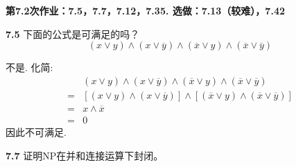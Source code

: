 \documentclass[UTF8]{report}
\newcommand{\problem}[1]{{\setlength{\parskip}{10pt}\noindent \bf{#1}}}
\newenvironment{solution}{{\noindent\hskip 2em \bf 解 \quad}}{}
\newcommand{\lno}[1]{\overline{#1}}
\newcommand{\NP}{\mathrm{NP}}
\begin{document}
\newpage

\textbf{第7.2次作业：7.5，7.7，7.12，7.35. 选做：7.13（较难），7.42}

\problem{7.5} 下面的公式是可满足的吗？
\[
    (x \lor y) \land (x \lor \lno y) \land (\lno x \lor y) \land (\lno x \lor \lno y)
\]

\begin{solution}
    不是. 化简:
    \begin{align*}
         {}& (x \lor y) \land (x \lor \lno y) \land (\lno x \lor y) \land (\lno x \lor \lno y) \\
        ={}& [(x \lor y) \land (x \lor \lno y)] \land [(\lno x \lor y) \land (\lno x \lor \lno y)] \\
        ={}& x \land \lno x \\
        ={}& 0
    \end{align*}
    因此不可满足.
\end{solution}

\problem{7.7} 证明$\NP$在并和连接运算下封闭。
\end{document}
